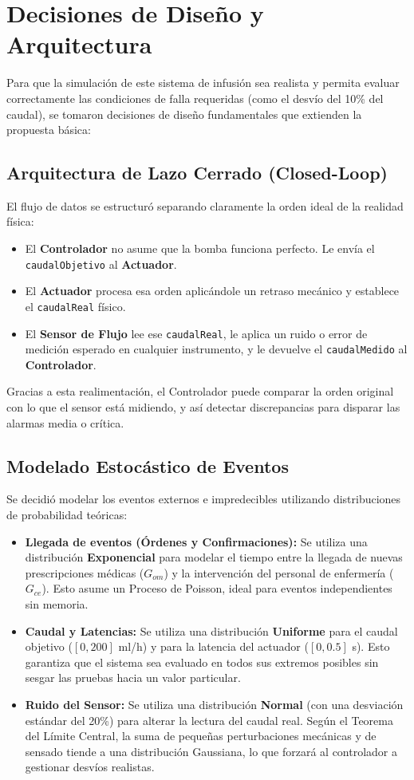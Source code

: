 \section{Decisiones de Diseño y Arquitectura}

Para que la simulación de este sistema de infusión sea realista y permita evaluar correctamente las condiciones de falla requeridas (como el desvío del 10\% del caudal), se tomaron decisiones de diseño fundamentales que extienden la propuesta básica:

\subsection{Arquitectura de Lazo Cerrado (Closed-Loop)}
El flujo de datos se estructuró separando claramente la orden ideal de la realidad física:
\begin{itemize}
    \item El \textbf{Controlador} no asume que la bomba funciona perfecto. Le envía el \texttt{caudalObjetivo} al \textbf{Actuador}.
    \item El \textbf{Actuador} procesa esa orden aplicándole un retraso mecánico y establece el \texttt{caudalReal} físico.
    \item El \textbf{Sensor de Flujo} lee ese \texttt{caudalReal}, le aplica un ruido o error de medición esperado en cualquier instrumento, y le devuelve el \texttt{caudalMedido} al \textbf{Controlador}.
\end{itemize}
Gracias a esta realimentación, el Controlador puede comparar la orden original con lo que el sensor está midiendo, y así detectar discrepancias para disparar las alarmas media o crítica.

\subsection{Modelado Estocástico de Eventos}
Se decidió modelar los eventos externos e impredecibles utilizando distribuciones de probabilidad teóricas:
\begin{itemize}
    \item \textbf{Llegada de eventos (Órdenes y Confirmaciones):} Se utiliza una distribución \textbf{Exponencial} para modelar el tiempo entre la llegada de nuevas prescripciones médicas ($G_{om}$) y la intervención del personal de enfermería ($G_{ce}$). Esto asume un Proceso de Poisson, ideal para eventos independientes sin memoria.
    \item \textbf{Caudal y Latencias:} Se utiliza una distribución \textbf{Uniforme} para el caudal objetivo ($[0, 200]$ ml/h) y para la latencia del actuador ($[0, 0.5]$ s). Esto garantiza que el sistema sea evaluado en todos sus extremos posibles sin sesgar las pruebas hacia un valor particular.
    \item \textbf{Ruido del Sensor:} Se utiliza una distribución \textbf{Normal} (con una desviación estándar del 20\%) para alterar la lectura del caudal real. Según el Teorema del Límite Central, la suma de pequeñas perturbaciones mecánicas y de sensado tiende a una distribución Gaussiana, lo que forzará al controlador a gestionar desvíos realistas.
\end{itemize}

